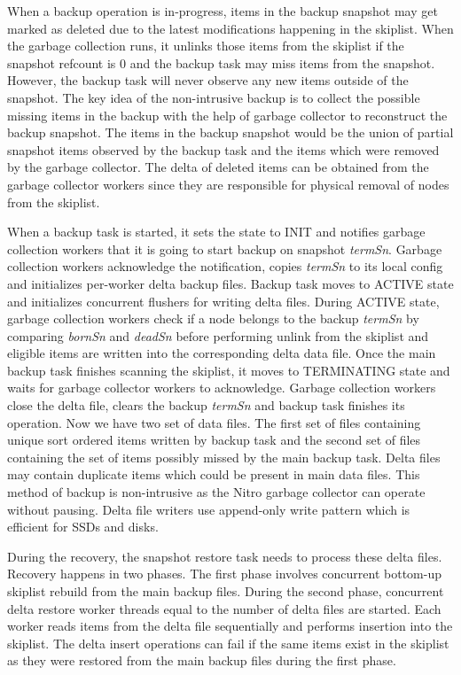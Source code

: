 \documentclass{vldb}
\begin{document}
When a backup operation is in-progress, items in the backup snapshot may get marked as deleted due to the latest modifications happening in the skiplist. When the garbage collection runs, it unlinks those items from the skiplist if the snapshot refcount is 0 and the backup task may miss items from the snapshot. However, the backup task will never observe any new items outside of the snapshot. The key idea of the non-intrusive backup is to collect the possible missing items in the backup with the help of garbage collector to reconstruct the backup snapshot. The items in the backup snapshot would be the union of partial snapshot items observed by the backup task and the items which were removed by the garbage collector. The delta of deleted items can be obtained from the garbage collector workers since they are responsible for physical removal of nodes from the skiplist. 


When a backup task is started, it sets the state to INIT and notifies garbage collection workers that it is going to start backup on snapshot \textit{termSn}. Garbage collection workers acknowledge the notification, copies \textit{termSn} to its local config and initializes per-worker delta backup files. Backup task moves to ACTIVE state and initializes concurrent flushers for writing delta files. During ACTIVE state, garbage collection workers check if a node belongs to the backup \textit{termSn} by comparing \textit{bornSn} and \textit{deadSn} before performing unlink from the skiplist and eligible items are written into the corresponding delta data file. Once the main backup task finishes scanning the skiplist, it moves to TERMINATING state and waits for garbage collector workers to acknowledge. Garbage collection workers close the delta file, clears the backup \textit{termSn} and backup task finishes its operation. Now we have two set of data files. The first set of files containing unique sort ordered items written by backup task and the second set of files containing the set of items possibly missed by the main backup task. Delta files may contain duplicate items which could be present in main data files. This method of backup is non-intrusive as the Nitro garbage collector can operate without pausing. Delta file writers use append-only write pattern which is efficient for SSDs and disks.

During the recovery, the snapshot restore task needs to process these delta files. Recovery happens in two phases. The first phase involves concurrent bottom-up skiplist rebuild from the main backup files. During the second phase, concurrent delta restore worker threads equal to the number of delta files are started. Each worker reads items from the delta file sequentially and performs insertion into the skiplist. The delta insert operations can fail if the same items exist in the skiplist as they were restored from the main backup files during the first phase.
\end{document}
